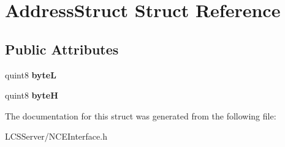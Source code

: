 \hypertarget{struct_address_struct}{}\section{Address\+Struct Struct Reference}
\label{struct_address_struct}
\subsection*{Public Attributes}
\begin{DoxyCompactItemize}
\item 
\mbox{\label{struct_address_struct_aebd98e7b030075130c8f673a61c70ea5}} 
quint8 {\bfseries byteL}
\item 
\mbox{\label{struct_address_struct_affacc3e44e30abd55a27ffb264507807}} 
quint8 {\bfseries byteH}
\end{DoxyCompactItemize}


The documentation for this struct was generated from the following file\+:\begin{DoxyCompactItemize}
\item 
L\+C\+S\+Server/N\+C\+E\+Interface.\+h\end{DoxyCompactItemize}
